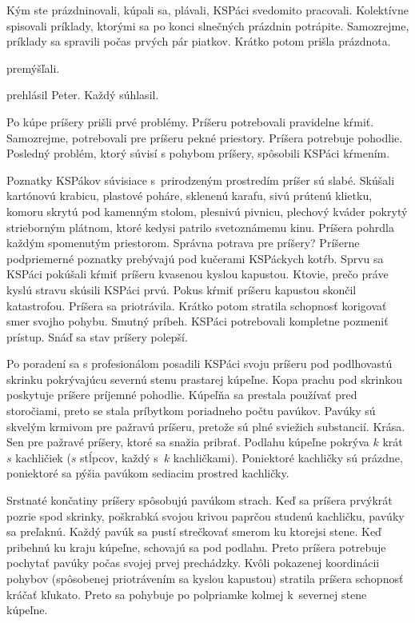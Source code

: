 Kým ste prázdninovali, kúpali sa, plávali, KSPáci svedomito pracovali.
Kolektívne spisovali príklady, ktorými sa po konci slnečných prázdnin potrápite.
Samozrejme, príklady sa spravili počas prvých pár piatkov. Krátko potom prišla prázdnota.

 premýšľali.


 prehlásil Peter. Každý súhlasil.

Po kúpe príšery prišli prvé problémy. Príšeru potrebovali pravidelne kŕmiť. Samozrejme, potrebovali pre
príšeru pekné priestory. Príšera potrebuje pohodlie. Posledný problém, ktorý súvisí s pohybom príšery, spôsobili KSPáci kŕmením.

Poznatky KSPákov súvisiace s~prirodzeným prostredím príšer sú slabé.
Skúšali kartónovú krabicu, plastové poháre, sklenenú karafu, sivú prútenú klietku, komoru skrytú pod kamenným stolom,
plesnivú pivnicu, plechový kváder pokrytý strieborným plátnom, ktoré kedysi patrilo svetoznámemu kinu.
Príšera pohrdla každým spomenutým priestorom. Správna potrava pre príšery? Príšerne podpriemerné poznatky prebývajú pod kučerami KSPáckych kotŕb.
Sprvu sa KSPáci pokúšali kŕmiť príšeru kvasenou kyslou kapustou. Ktovie, prečo práve kyslú stravu skúsili KSPáci prvú.
Pokus kŕmiť príšeru kapustou skončil katastrofou. Príšera sa priotrávila. Krátko potom stratila schopnosť korigovať smer svojho pohybu.
Smutný príbeh. KSPáci potrebovali kompletne pozmeniť prístup. Snáď sa stav príšery polepší.

Po poradení sa s profesionálom posadili KSPáci svoju príšeru pod podlhovastú skrinku pokrývajúcu severnú stenu prastarej kúpeľne.
Kopa prachu pod skrinkou poskytuje príšere príjemné pohodlie. Kúpeľňa sa prestala používať pred storočiami,
preto se stala príbytkom poriadneho počtu pavúkov. Pavúky sú skvelým krmivom pre pažravú príšeru, pretože sú plné sviežich substancií.
Krása. Sen pre pažravé príšery, ktoré sa snažia pribrať. Podlahu kúpeľne pokrýva $k$ krát $s$ kachličiek ($s$ stĺpcov, každý s~$k$ kachličkami).
Poniektoré kachličky sú prázdne, poniektoré sa pýšia pavúkom sediacim prostred kachličky.

Srstnaté končatiny príšery spôsobujú pavúkom strach. Keď sa príšera prvýkrát pozrie spod skrinky,
poškrabká svojou krivou paprčou studenú kachličku, pavúky sa preľaknú.
Každý pavúk sa pustí strečkovať smerom ku ktorejsi stene.
Keď pribehnú ku kraju kúpeľne, schovajú sa pod podlahu. Preto príšera potrebuje pochytať pavúky počas svojej prvej prechádzky.
Kvôli pokazenej koordinácii pohybov (spôsobenej priotrávením sa kyslou kapustou) stratila príšera schopnosť kráčať kľukato.
Preto sa pohybuje po polpriamke kolmej k~severnej stene kúpeľne.

